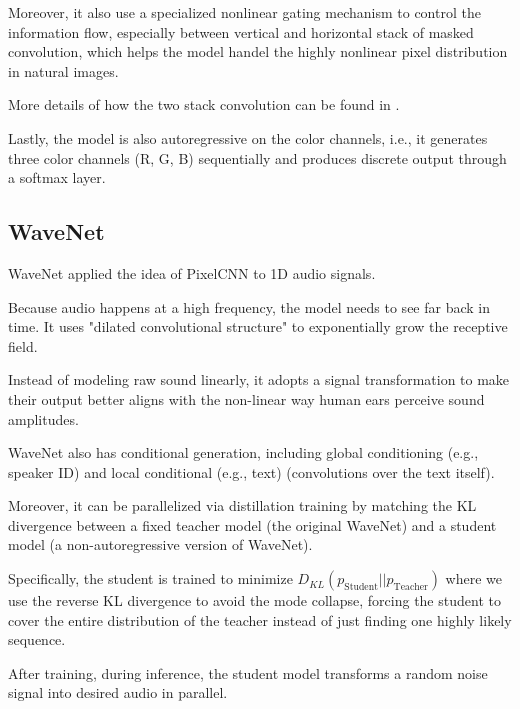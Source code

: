 \documentclass{mytufte-light}
\begin{document}
Moreover, it also use a specialized nonlinear gating mechanism to 
control the information flow, especially between vertical and horizontal stack of masked convolution, 
which helps the model handel the highly nonlinear pixel distribution in natural images.

More details of how the two stack convolution can be found in 
\href{https://towardsdatascience.com/pixelcnns-blind-spot-84e19a3797b9/}{\color{blue}{this blog post}}.

Lastly, the model is also autoregressive on the color channels, i.e., it generates three color channels (R, G, B) sequentially
and produces discrete output through a softmax layer.

\subsection{WaveNet}
WaveNet applied the idea of PixelCNN to 1D audio signals.

Because audio happens at a high frequency, the model needs to see far back in time. 
It uses "dilated convolutional structure" to exponentially grow the receptive field.

Instead of modeling raw sound linearly, it adopts a signal transformation to
make their output better aligns with the non-linear way human ears perceive sound amplitudes.

WaveNet also has conditional generation, including global conditioning (e.g., speaker ID) 
and local conditional (e.g., text)
(convolutions over the text itself).

Moreover, it can be parallelized via distillation training
by matching the KL divergence between a fixed teacher model (the original WaveNet) 
and a student model (a non-autoregressive version of WaveNet).

Specifically, the student is trained to minimize \(D_{KL}(p_{\text{Student}} || p_{\text{Teacher}})\)
where we use the reverse KL divergence to avoid the mode collapse, forcing the student
to cover the entire distribution of the teacher instead of just finding one highly likely sequence.

After training, during inference, the student model transforms
a random noise signal into desired audio in parallel.
\end{document}
